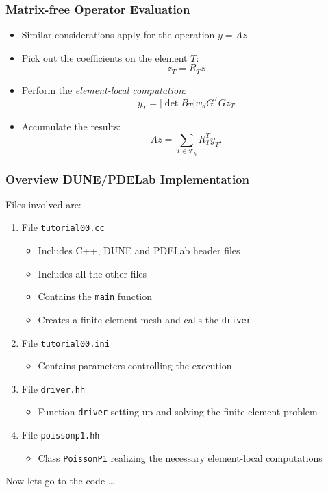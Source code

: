 \documentclass[ignorenonframetext,11pt]{beamer}
\theoremstyle{definition}
\begin{document}
\begin{frame}
\frametitle{Matrix-free Operator Evaluation}
\begin{itemize}
\item Similar considerations apply for the operation $y=Az$
\item Pick out the coefficients on the element $T$:
$$z_T = R_T z$$
\item Perform the {\em element-local computation}:
\begin{equation*}
y_T = |\det B_T| w_d G^T G z_T
\end{equation*}
\item Accumulate the results:
\begin{equation*}
Az =  \sum_{T\in\mathcal{T}_h} R_T^T y_T.
\end{equation*}
\end{itemize}
\end{frame}

\begin{frame}
\frametitle{Overview DUNE/PDELab Implementation}
Files involved are:
\begin{enumerate}[1)]
\item File \lstinline{tutorial00.cc}
\begin{itemize}
\item Includes C++, DUNE and PDELab header files
\item Includes all the other files
\item Contains the \lstinline{main} function
\item Creates a finite element mesh and calls the \lstinline{driver}
\end{itemize}
\item File \lstinline{tutorial00.ini}
\begin{itemize}
\item Contains parameters controlling the execution
\end{itemize}
\item File \lstinline{driver.hh}
\begin{itemize}
\item Function \lstinline{driver} setting up and solving the finite element problem
\end{itemize}
\item File \lstinline{poissonp1.hh}
\begin{itemize}
\item Class \lstinline{PoissonP1}
realizing the necessary element-local computations
\end{itemize}
\end{enumerate}
Now lets go to the code \ldots
\end{frame}
\end{document}
